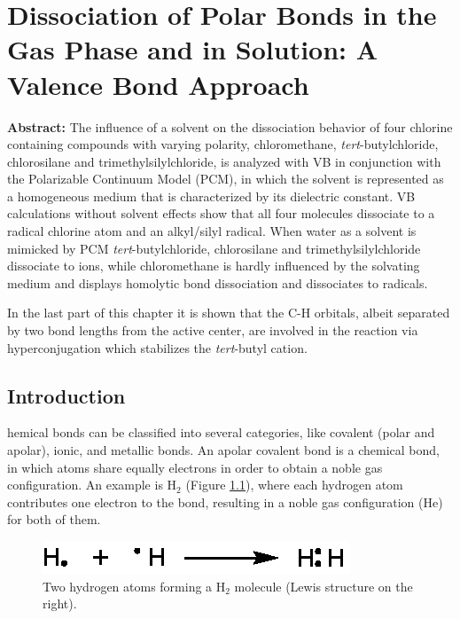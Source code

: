 \chapter{Dissociation of Polar Bonds in the Gas Phase and in Solution: A Valence Bond Approach}
\label{chap_dissociation}



\noindent\textbf{Abstract:} The influence of a solvent on the dissociation behavior of four chlorine containing compounds with varying polarity, chloromethane, \textit{tert}-butylchloride, chlorosilane and trimethylsilylchloride, is analyzed with VB in conjunction with the Polarizable Continuum Model (PCM), in which the solvent is represented as a homogeneous medium that is characterized by its dielectric constant. VB calculations without solvent effects show that all four molecules dissociate to a radical chlorine atom and an alkyl/silyl radical. When water as a solvent is mimicked by PCM \textit{tert}-butylchloride, chlorosilane and trimethylsilylchloride dissociate to ions, while chloromethane is hardly influenced by the solvating medium and displays homolytic bond dissociation and dissociates to radicals.


In the last part of this chapter it is shown that the C-H orbitals, albeit separated by two bond lengths from the active center, are involved in the reaction via hyperconjugation which stabilizes the \textit{tert}-butyl cation. 

\clearpage

\section{Introduction}

\lettrine{}{}hemical bonds can be classified into several categories, like covalent (polar and apolar), ionic, and metallic bonds. An apolar covalent bond is a chemical bond, in which atoms share equally electrons in order to obtain a noble gas configuration. An example is H$_2$ (Figure \ref{ch3.fig.h_twee}), where each hydrogen atom contributes one electron to the bond, resulting in a noble gas configuration (He) for both of them.
\begin{figure}[ht]
\center
\includegraphics{dissociation/figures/h_twee.eps}
\caption{Two hydrogen atoms forming a H$_2$ molecule (Lewis structure on the right).}
\label{ch3.fig.h_twee} 
\end{figure}

